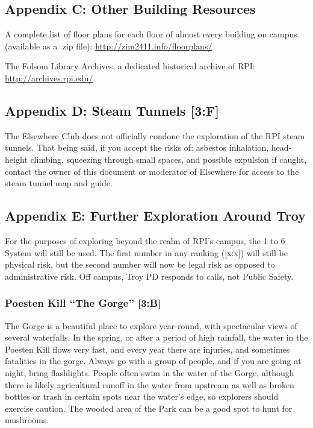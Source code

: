 \documentclass{article}
\begin{document}
\subsection{Appendix C: Other Building Resources}

A complete list of floor plans for each floor of almost every building on campus (available as a .zip file): \href{http://zim2411.info/floorplans/}{http://zim2411.info/floorplans/}

\medskip
\noindent
The Folsom Library Archives, a dedicated historical archive of RPI: \href{http://archives.rpi.edu/}{http://archives.rpi.edu/}

\subsection{Appendix D: Steam Tunnels [3:F]}
The Elsewhere Club does not officially condone the exploration of the RPI steam tunnels. That being said, if you accept the risks of: asbestos inhalation, head-height climbing, squeezing through small spaces, and possible expulsion if caught, contact the owner of this document or moderator of Elsewhere for access to the steam tunnel map and guide.

\subsection{Appendix E: Further Exploration Around Troy}
For the purposes of exploring beyond the realm of RPI’s campus, the 1 to 6 System will still be used. The first number in any ranking ([x:x]) will still be physical risk, but the second number will now be legal risk as opposed to administrative risk. Off campus, Troy PD responds to calls, not Public Safety.

\subsubsection{Poesten Kill “The Gorge” [3:B]}
The Gorge is a beautiful place to explore year-round, with spectacular views of several waterfalls. In the spring, or after a period of high rainfall, the water in the Poesten Kill flows very fast, and every year there are injuries, and sometimes fatalities in the gorge. Always go with a group of people, and if you are going at night, bring flashlights. People often swim in the water of the Gorge, although there is likely agricultural runoff in the water from upstream as well as broken bottles or trash in certain spots near the water’s edge, so explorers should exercise caution. The wooded area of the Park can be a good spot to hunt for mushrooms.
\end{document}
